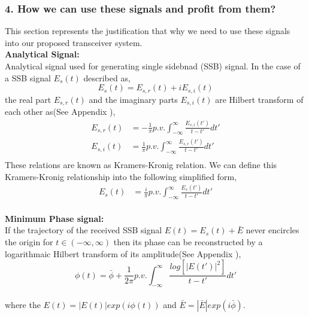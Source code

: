 \subsubsection{4. How we can use these signals and profit from them?}
This section represents the justification that why we need to use these signals into our proposed transceiver system.\\
\textbf{Analytical Signal:}\\
Analytical signal used for generating single sidebnad (SSB) signal. In the case of a SSB signal $E_s(t)$ described as,
\begin{equation}
E_s(t)=E_{s,r}(t)+iE_{s,i}(t)
\label{5.15}
\end{equation}
the real part $E_{s,r}(t)$  and the imaginary parts $E_{s,i}(t)$ are Hilbert transform of each other as(See Appendix ),
\begin{equation}
\begin{split}
E_{s,r}(t) &=-\frac{1}{\pi} p.v. \int_{-\infty}^{\infty} \frac{E_{s,i}(t')}{t-t'} dt' \\
E_{s,i}(t) &=\frac{1}{\pi} p.v. \int_{-\infty}^{\infty} \frac{E_{s,r}(t')}{t-t'} dt' \\
\end{split}
\label{E}
\end{equation}
These relations are known as Kramers-Kronig relation. We can define this Kramers-Kronig relationship into the following simplified form,
\begin{equation}
\begin{split}
E_{s}(t) &=\frac{i}{\pi} p.v. \int_{-\infty}^{\infty} \frac{E_{s}(t')}{t-t'} dt' 
\end{split}
\label{Eq:5.17}
\end{equation}\\
\textbf{Minimum Phase signal:}\\
If the trajectory of the received SSB signal $E(t)=E_{s}(t)+\bar{E}$ never encircles the origin for $t\in(-\infty,\infty)$ then its phase can be reconstructed by a logarithmaic Hilbert transform of its amplitude(See Appendix ),
\begin{equation}
\phi(t) = \bar{\phi} + \dfrac{1}{2\pi} p.v. \int_{-\infty}^{\infty} \dfrac{log[|E(t')|^2]}{t-t'} dt'
\end{equation}\\
where the $E(t)=|E(t)|exp(i\phi(t))$ and $\bar{E}=|\bar{E}|exp(i\bar{\phi})$.

